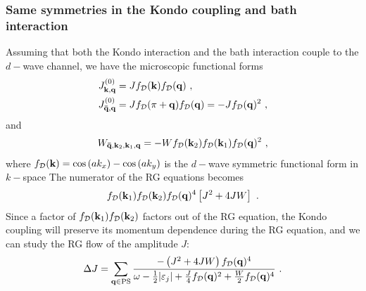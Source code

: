 \documentclass[reprint,hidelinks]{revtex4-2}
\begin{document}
\subsubsection{Same symmetries in the Kondo coupling and bath interaction}
Assuming that both the Kondo interaction and the bath interaction couple to the \(d-\)wave channel, we have the microscopic functional forms 
\begin{equation}\begin{aligned}
	J^{(0)}_{{\bf k},{\bf q}} &= J f_\mathcal{D}({\bf k}) f_\mathcal{D}({\bf q})~,\\
	J^{(0)}_{{\bf \bar q},{\bf q}} &= J f_\mathcal{D}(\pi + {\bf q}) f_\mathcal{D}({\bf q}) = -Jf_\mathcal{D}({\bf q})^2 ~,
\end{aligned}\end{equation}
and
\begin{equation}\begin{aligned}
	W_{{\bf \bar q}, {\bf k}_2, {\bf k}_1, {\bf q}} = -W f_\mathcal{D}({\bf k}_2)f_\mathcal{D}({\bf k}_1)f_\mathcal{D}({\bf q})^2~,
\end{aligned}\end{equation}
where \(f_\mathcal{D}({\bf k}) = \cos\left( ak_{x} \right) - \cos\left( ak_y \right) \) is the \(d-\)wave symmetric functional form in \(k-\)space
The numerator of the RG equations becomes
\begin{equation}\begin{aligned}
	f_\mathcal{D}({\bf k}_1)f_\mathcal{D}({\bf k}_2)f_\mathcal{D}({\bf q})^4\left[J^2 + 4JW\right] ~.
\end{aligned}\end{equation}
Since a factor of \(f_\mathcal{D}({\bf k}_1)f_\mathcal{D}({\bf k}_2)\) factors out of the RG equation, the Kondo coupling will preserve its momentum dependence during the RG equation, and we can study the RG flow of the amplitude \(J\):
\begin{equation}\begin{aligned}
	\Delta J = \sum_{{\bf q} \in \text{PS}} \frac{-\left(J^2 + 4JW\right) f_\mathcal{D}({\bf q})^4}{\omega - \frac{1}{2}|\varepsilon_j| + \frac{J}{4}f_\mathcal{D}({\bf q})^2 + \frac{W}{2}f_\mathcal{D}({\bf q})^4}~.
\end{aligned}\end{equation}
\end{document}
